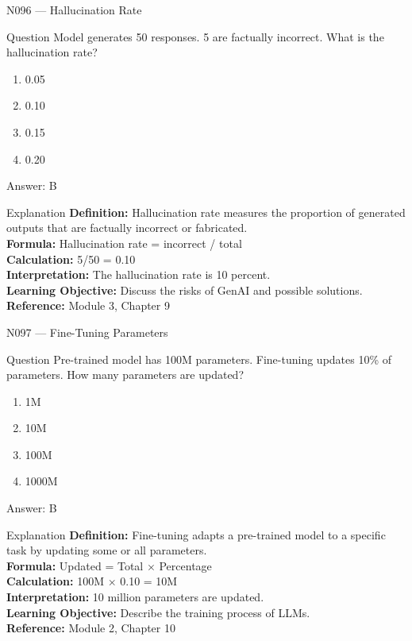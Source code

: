 \documentclass[aspectratio=169,8pt]{beamer}
\begin{document}
	\begin{frame}{N096 --- Hallucination Rate}
		\begin{block}{Question}
			Model generates 50 responses. 5 are factually incorrect. What is the hallucination rate?
			\begin{enumerate}
				\item 0.05
				\item 0.10
				\item 0.15
				\item 0.20
			\end{enumerate}
		\end{block}
		\begin{exampleblock}{Answer: B}\end{exampleblock}
		\begin{block}{Explanation}
			\textbf{Definition:} Hallucination rate measures the proportion of generated outputs that are factually incorrect or fabricated.\\
			\textbf{Formula:} Hallucination rate = incorrect / total\\
			\textbf{Calculation:} 5/50 = 0.10\\
			\textbf{Interpretation:} The hallucination rate is 10 percent.\\
			\textbf{Learning Objective:} Discuss the risks of GenAI and possible solutions.\\
			\textbf{Reference:} Module 3, Chapter 9
		\end{block}
	\end{frame}
	
	\begin{frame}{N097 --- Fine-Tuning Parameters}
		\begin{block}{Question}
			Pre-trained model has 100M parameters. Fine-tuning updates 10\% of parameters. How many parameters are updated?
			\begin{enumerate}
				\item 1M
				\item 10M
				\item 100M
				\item 1000M
			\end{enumerate}
		\end{block}
		\begin{exampleblock}{Answer: B}\end{exampleblock}
		\begin{block}{Explanation}
			\textbf{Definition:} Fine-tuning adapts a pre-trained model to a specific task by updating some or all parameters.\\
			\textbf{Formula:} Updated = Total $\times$ Percentage\\
			\textbf{Calculation:} 100M $\times$ 0.10 = 10M\\
			\textbf{Interpretation:} 10 million parameters are updated.\\
			\textbf{Learning Objective:} Describe the training process of LLMs.\\
			\textbf{Reference:} Module 2, Chapter 10
		\end{block}
	\end{frame}
	
\end{document}
